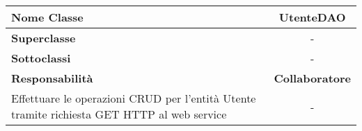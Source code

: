 
\setcounter{table}{0}
\begin{table}[H]
    \centering
    \begin{tabularx}{\textwidth}{||   X  ||  c   ||}
        \rowcolor{Gray}
        \hline
        \textbf{Nome Classe} & UtenteDAO \\
        \hline
        \textbf{Superclasse}  &  - \\
        \hline
        \textbf{Sottoclassi} & - \\
        \hline
        \hline
         \textbf{Responsabilità} & \textbf{Collaboratore} \\
         \hline
          Effettuare le operazioni \gls{CRUD} per l'entità Utente tramite richiesta GET HTTP al web service & - \\
         \hline
    \end{tabularx}
\end{table}
